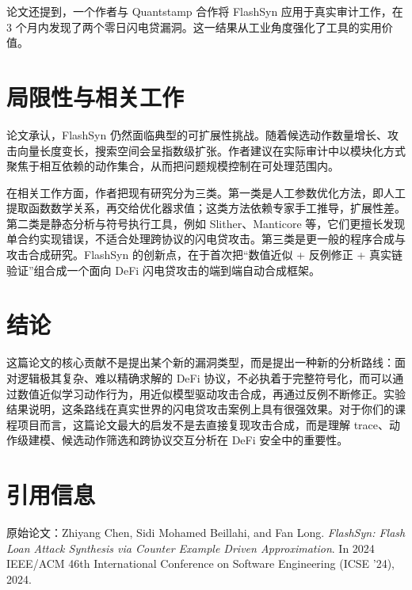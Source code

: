 \documentclass[UTF8,11pt]{ctexart}
\begin{document}
论文还提到，一个作者与 Quantstamp 合作将 FlashSyn 应用于真实审计工作，在 3 个月内发现了两个零日闪电贷漏洞。这一结果从工业角度强化了工具的实用价值。

\section{局限性与相关工作}
论文承认，FlashSyn 仍然面临典型的可扩展性挑战。随着候选动作数量增长、攻击向量长度变长，搜索空间会呈指数级扩张。作者建议在实际审计中以模块化方式聚焦于相互依赖的动作集合，从而把问题规模控制在可处理范围内。

在相关工作方面，作者把现有研究分为三类。第一类是人工参数优化方法，即人工提取函数数学关系，再交给优化器求值；这类方法依赖专家手工推导，扩展性差。第二类是静态分析与符号执行工具，例如 Slither、Manticore 等，它们更擅长发现单合约实现错误，不适合处理跨协议的闪电贷攻击。第三类是更一般的程序合成与攻击合成研究。FlashSyn 的创新点，在于首次把“数值近似 + 反例修正 + 真实链验证”组合成一个面向 DeFi 闪电贷攻击的端到端自动合成框架。

\section{结论}
这篇论文的核心贡献不是提出某个新的漏洞类型，而是提出一种新的分析路线：面对逻辑极其复杂、难以精确求解的 DeFi 协议，不必执着于完整符号化，而可以通过数值近似学习动作行为，用近似模型驱动攻击合成，再通过反例不断修正。实验结果说明，这条路线在真实世界的闪电贷攻击案例上具有很强效果。对于你们的课程项目而言，这篇论文最大的启发不是去直接复现攻击合成，而是理解 trace、动作级建模、候选动作筛选和跨协议交互分析在 DeFi 安全中的重要性。

\section*{引用信息}
原始论文：Zhiyang Chen, Sidi Mohamed Beillahi, and Fan Long. \textit{FlashSyn: Flash Loan Attack Synthesis via Counter Example Driven Approximation}. In 2024 IEEE/ACM 46th International Conference on Software Engineering (ICSE '24), 2024.
\end{document}
